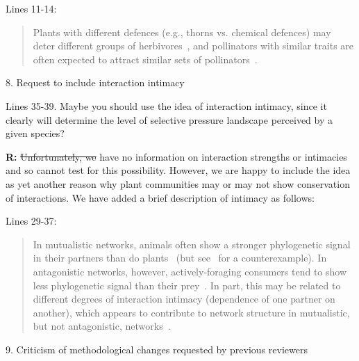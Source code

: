 \documentclass[12pt]{letter}
\newenvironment{refquote}{\bigskip \begin{it}}{\end{it}\smallskip}
\providecommand{\DIFadd}[1]{{\protect\color{blue}\uwave{#1}}} %
\providecommand{\DIFdel}[1]{{\protect\color{red}\sout{#1}}}                      %
\providecommand{\DIFaddbegin}{} %
\providecommand{\DIFaddend}{} %
\providecommand{\DIFdelbegin}{} %
\providecommand{\DIFdelend}{} %
\newcommand{\DIFscaledelfig}{0.5}
\newlength{\DIFdelgraphicswidth} %
\newlength{\DIFdelgraphicsheight} %
\newcommand{\DIFaddincludegraphics}[2][]{{\color{blue}\fbox{\DIFOincludegraphics[#1]{#2}}}} %
\newcommand{\DIFdelincludegraphics}[2][]{%
\sbox{\DIFdelgraphicsbox}{\DIFOincludegraphics[#1]{#2}}%
\settoboxwidth{\DIFdelgraphicswidth}{\DIFdelgraphicsbox} %
\settoboxtotalheight{\DIFdelgraphicsheight}{\DIFdelgraphicsbox} %
\scalebox{\DIFscaledelfig}{%
\parbox[b]{\DIFdelgraphicswidth}{\usebox{\DIFdelgraphicsbox}\\[-\baselineskip] \rule{\DIFdelgraphicswidth}{0em}}\llap{\resizebox{\DIFdelgraphicswidth}{\DIFdelgraphicsheight}{%
\setlength{\unitlength}{\DIFdelgraphicswidth}%
\begin{picture}(1,1)%
\thicklines\linethickness{2pt} %
{\color[rgb]{1,0,0}\put(0,0){\framebox(1,1){}}}%
{\color[rgb]{1,0,0}\put(0,0){\line( 1,1){1}}}%
{\color[rgb]{1,0,0}\put(0,1){\line(1,-1){1}}}%
\end{picture}%
}\hspace*{3pt}}} %
} %
\DeclareRobustCommand{\DIFaddbegin}{\DIFOaddbegin \let\includegraphics\DIFaddincludegraphics} %
\DeclareRobustCommand{\DIFaddend}{\DIFOaddend \let\includegraphics\DIFOincludegraphics} %
\DeclareRobustCommand{\DIFdelbegin}{\DIFOdelbegin \let\includegraphics\DIFdelincludegraphics} %
\DeclareRobustCommand{\DIFdelend}{\DIFOaddend \let\includegraphics\DIFOincludegraphics} %
\begin{document}
		Lines 11-14:

		\begin{quotation}

			Plants with different defences 
			(e.g., thorns vs. chemical defences) may deter different groups of 
			herbivores~\citep{Ehrlich1964,Johnson2014}, and pollinators with similar traits are often expected to attract similar sets of pollinators~\citep{Waser1996,Fenster2004,Ollerton2009}.

		\end{quotation}


	8. Request to include interaction intimacy

		\begin{refquote}
		Lines 35-39. Maybe you should use the idea of interaction intimacy, since it clearly will determine the level of selective pressure landscape perceived by a given species?
		\end{refquote}


		\textbf{R:} \DIFdelbegin \DIFdel{Unfortunately, we }\DIFdelend \DIFaddbegin \DIFadd{We }\DIFaddend have no information on interaction strengths or intimacies and so cannot test for this possibility. However, we are happy to include the idea as yet another reason why plant communities may or may not show conservation of interactions. We have added a brief description of intimacy as follows:


		Lines 29-37:

		\begin{quotation}

			In mutualistic networks, animals often show a stronger phylogenetic signal in their partners than do plants~\citep{Rezende2007a,Chamberlain2014,Rohr2014,Vamosi2014,Lind2015,Fontaine2015} (but see~\citet{Rafferty2013} for a counterexample). In antagonistic networks, however, actively-foraging consumers tend to show less phylogenetic signal than their prey~\citep{Ives2006,Cagnolo2011,Naisbit2011,Fontaine2015}. In part, this may be related to different degrees of interaction intimacy (dependence of one partner on another), which appears to contribute to network structure in mutualistic, but not antagonistic, networks~\citep{Guimaraes2007,Ponisio2017}.

		\end{quotation}


	9. Criticism of methodological changes requested by previous reviewers
\end{document}
